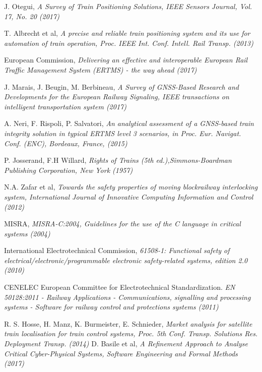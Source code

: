 \begin{thebibliography}{9}

J. Otegui, \textit{A Survey of Train Positioning Solutions, IEEE Sensors Journal, Vol. 17, No. 20 (2017)}

T. Albrecht et al, \textit{A precise and reliable train positioning system and its use for automation of train
operation, Proc. IEEE Int. Conf. Intell. Rail Transp. (2013)}

European Commission, \textit{
	Delivering an effective and interoperable European Rail Traffic Management System
	(ERTMS) - the way ahead (2017)}

J. Marais, J. Beugin, M. Berbineau, \textit{A Survey of GNSS-Based Research and
	Developments for the European Railway Signaling, IEEE transactions on intelligent transportation system (2017)}

A. Neri, F. Rispoli, P. Salvatori, \textit{An analytical assessment of
a GNSS-based train integrity solution in typical ERTMS level 3
scenarios, in Proc. Eur. Navigat. Conf. (ENC), Bordeaux, France, (2015)}

 P. Josserand, F.H Willard, \textit{Rights of Trains (5th ed.),Simmons-Boardman Publishing Corporation, New York (1957)}
 
N.A. Zafar et al, \textit{Towards the safety properties of moving blockrailway interlocking system, International Journal of Innovative Computing Information and Control (2012)}

MISRA, \textit{MISRA-C:2004, Guidelines for the use of the C language in critical systems (2004)}

International Electrotechnical Commission, \textit{61508-1: Functional safety of electrical/electronic/programmable electronic safety-related systems, edition 2.0 (2010)}


CENELEC European Committee for Electrotechnical Standardization. \textit{EN 50128:2011 - Railway Applications - Communications, signalling and processing systems - Software for railway control and protections systems (2011)}

R. S. Hosse, H. Manz, K. Burmeister, E. Schnieder, \textit{Market
analysis for satellite train localisation for train control systems,
Proc. 5th Conf. Transp. Solutions Res. Deployment Transp. (2014)}
D. Basile et al, \textit{A Refinement Approach to Analyse Critical Cyber-Physical Systems,
Software Engineering and Formal Methods  (2017)}


\end{thebibliography}
